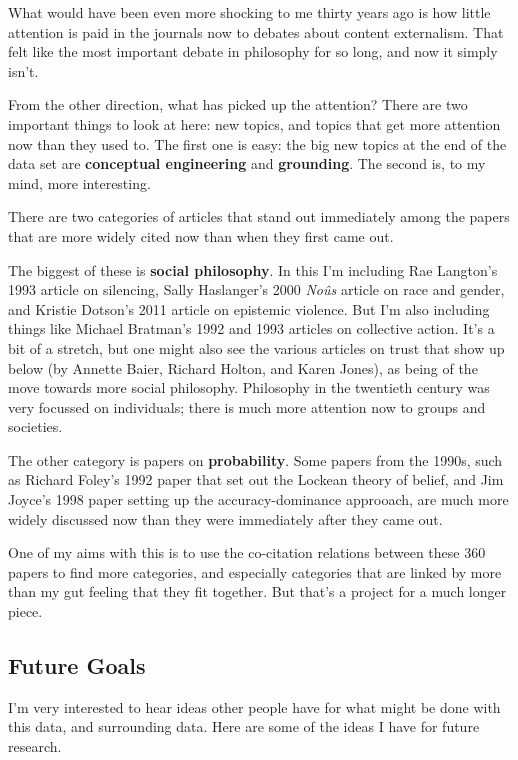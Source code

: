 \documentclass[
  10pt,
  letterpaper,
  DIV=11,
  numbers=noendperiod,
  twoside]{scrartcl}
\begin{document}
What would have been even more shocking to me thirty years ago is how
little attention is paid in the journals now to debates about content
externalism. That felt like the most important debate in philosophy for
so long, and now it simply isn't.

From the other direction, what has picked up the attention? There are
two important things to look at here: new topics, and topics that get
more attention now than they used to. The first one is easy: the big new
topics at the end of the data set are \textbf{conceptual engineering}
and \textbf{grounding}. The second is, to my mind, more interesting.

There are two categories of articles that stand out immediately among
the papers that are more widely cited now than when they first came out.

The biggest of these is \textbf{social philosophy}. In this I'm
including Rae Langton's 1993 article on silencing, Sally Haslanger's
2000 \emph{Noûs} article on race and gender, and Kristie Dotson's 2011
article on epistemic violence. But I'm also including things like
Michael Bratman's 1992 and 1993 articles on collective action. It's a
bit of a stretch, but one might also see the various articles on trust
that show up below (by Annette Baier, Richard Holton, and Karen Jones),
as being of the move towards more social philosophy. Philosophy in the
twentieth century was very focussed on individuals; there is much more
attention now to groups and societies.

The other category is papers on \textbf{probability}. Some papers from
the 1990s, such as Richard Foley's 1992 paper that set out the Lockean
theory of belief, and Jim Joyce's 1998 paper setting up the
accuracy-dominance approoach, are much more widely discussed now than
they were immediately after they came out.

One of my aims with this is to use the co-citation relations between
these 360 papers to find more categories, and especially categories that
are linked by more than my gut feeling that they fit together. But
that's a project for a much longer piece.

\subsection{Future Goals}\label{sec-future-goals}

I'm very interested to hear ideas other people have for what might be
done with this data, and surrounding data. Here are some of the ideas I
have for future research.
\end{document}

